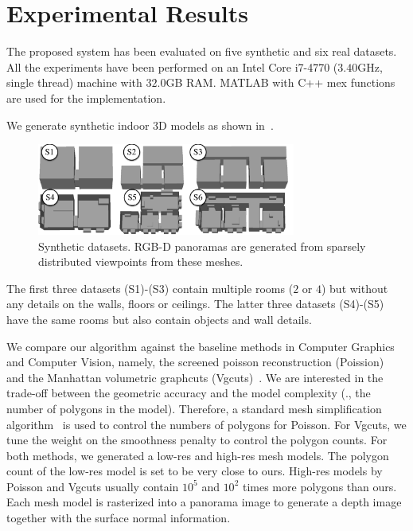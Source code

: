 \section{Experimental Results}
The proposed system has been evaluated on five synthetic and six real
datasets. All the experiments have been performed on an Intel Core
i7-4770 ($3.40$GHz, single thread) machine with $32.0$GB RAM. MATLAB
with C++ mex functions are used for the implementation.

 We generate synthetic indoor 3D models
as shown in~.
%
\begin{figure}[!t]
\begin{center}
\includegraphics[width=85mm]{../figures/synth2.pdf}
\end{center}
 \vspace{-0.3cm}
\caption{Synthetic datasets. RGB-D panoramas are generated from sparsely
distributed viewpoints from these meshes.}  \label{fig:synth}
 \vspace{-0.2cm}
\end{figure}
%
The first three datasets (S1)-(S3) contain multiple rooms ($2$ or $4$)
but without any details on the walls, floors or ceilings. The latter
three datasets (S4)-(S5) have the same rooms but also contain objects
and wall details.

We compare our algorithm against the baseline methods in Computer
Graphics and Computer Vision, namely, the screened poisson
reconstruction (Poission)~\cite{Kazhdan2013} and the Manhattan
volumetric graphcuts (Vgcuts)~\cite{furukawa-iccv-2009}. We are
interested in the trade-off between the geometric accuracy and the model
complexity (\eg., the number of polygons in the model). Therefore, a
standard mesh simplification algorithm~\cite{Tarini2010} is used to
control the numbers of polygons for Poisson. For Vgcuts, we tune the
weight on the smoothness penalty to control the polygon counts. For both
methods, we generated a low-res and high-res mesh models. The polygon
count of the low-res model is set to be very close to ours. High-res
models by Poisson and Vgcuts usually contain $10^5$ and $10^2$ times
more polygons than ours.
%
Each mesh
model is rasterized into a panorama image to generate a depth image
together with the surface normal information.

